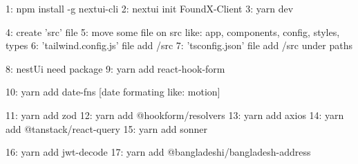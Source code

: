 1: npm install -g nextui-cli
2: nextui init FoundX-Client
3: yarn dev


4: create 'src' file
5: move some file on src like: app, components, config, styles, types
6: 'tailwind.config.js' file add /src
7: 'tsconfig.json' file add /src under paths

8: nestUi need package
9: yarn add react-hook-form

10: yarn add date-fns [date formating like: motion]

11: yarn add zod
12: yarn add @hookform/resolvers
13: yarn add axios
14: yarn add @tanstack/react-query
15: yarn add sonner

16: yarn add jwt-decode
17: yarn add @bangladeshi/bangladesh-address